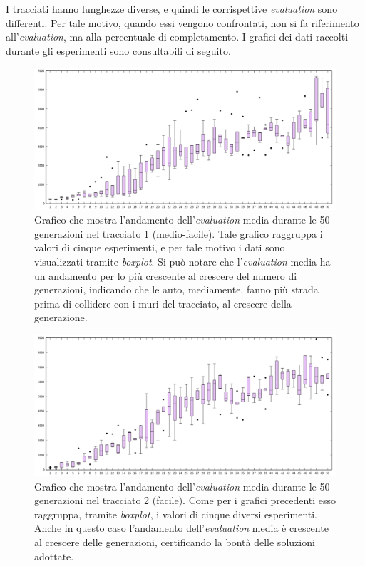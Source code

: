 \documentclass[a4paper,12pt]{article}
\begin{document}
I tracciati hanno lunghezze diverse, e quindi le corrispettive \emph{evaluation} sono differenti. Per tale motivo, quando essi vengono confrontati, non si fa riferimento all'\emph{evaluation}, ma alla percentuale di completamento. I grafici dei dati raccolti durante gli esperimenti sono consultabili di seguito.

\begin{figure}[H]
	\centering
	\includegraphics[width=130mm]{../results/track01/averageEvaluation.png}
	\caption{Grafico che mostra l'andamento dell'\emph{evaluation} media durante le 50 generazioni nel tracciato 1 (medio-facile). Tale grafico raggruppa i valori di cinque esperimenti, e per tale motivo i dati sono visualizzati tramite \emph{boxplot}. Si può notare che l'\emph{evaluation} media ha un andamento per lo più crescente al crescere del numero di generazioni, indicando che le auto, mediamente, fanno più strada prima di collidere con i muri del tracciato, al crescere della generazione.}
\end{figure}

\begin{figure}[H]
	\centering
	\includegraphics[width=130mm]{../results/track02/averageEvaluation.png}
	\caption{Grafico che mostra l'andamento dell'\emph{evaluation} media durante le 50 generazioni nel tracciato 2 (facile). Come per i grafici precedenti esso raggruppa, tramite \emph{boxplot}, i valori di cinque diversi esperimenti. Anche in questo caso l'andamento dell'\emph{evaluation} media è crescente al crescere delle generazioni, certificando la bontà delle soluzioni adottate. }
\end{figure}
\end{document}
